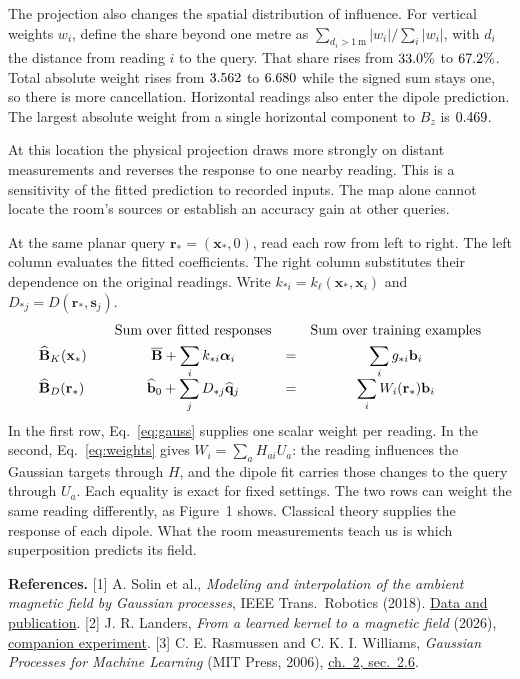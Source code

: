 \documentclass[11pt,letterpaper]{article}
\newcommand{\head}[1]{\par\Needspace{7\baselineskip}\medskip{\large\bfseries #1}\par\nobreak}
\newcommand{\B}{\mathbf B}
\newcommand{\bb}{\mathbf b}
\newcommand{\rr}{\mathbf r}
\newcommand{\xx}{\mathbf x}
\begin{document}
The projection also changes the spatial distribution of influence. For vertical
weights \(w_i\), define the share beyond one metre as
\(\sum_{d_i>1\,\mathrm m}|w_i|/\sum_i|w_i|\), with \(d_i\) the distance
from reading \(i\) to the query. That share rises from \(33.0\%\) to
\(67.2\%\). Total absolute weight rises from \(3.562\) to
\(6.680\) while the signed sum stays one, so there is more cancellation.
Horizontal readings also enter the dipole prediction. The largest absolute
weight from a single horizontal component to \(B_z\) is \(0.469\).

At this location the physical projection draws more strongly on distant
measurements and reverses the response to one nearby reading. This is a
sensitivity of the fitted prediction to recorded inputs. The map alone
cannot locate the room's sources or establish an accuracy gain at other queries.

\head{6. In what sense is the classical field learned?}
At the same planar query \(\rr_*=(\xx_*,0)\), read each row from left to right.
The left column evaluates the fitted coefficients. The right column substitutes
their dependence on the original readings. Write \(k_{*i}=k_\ell(\xx_*,\xx_i)\)
and \(D_{*j}=D(\rr_*,\mathbf s_j)\).
\[
\begin{array}{l@{\qquad}c@{\quad}c@{\quad}c}
 & \text{Sum over fitted responses} && \text{Sum over training examples}\\[4pt]
\widehat{\B}_K(\xx_*) &
 \displaystyle\overline{\B}+\sum_i k_{*i}\boldsymbol\alpha_i
 &=& \displaystyle\sum_i g_{*i}\bb_i \\[7pt]
\widehat{\B}_D(\rr_*) &
 \displaystyle\widehat{\bb}_0+\sum_j D_{*j}\widehat{\mathbf q}_j
 &=& \displaystyle\sum_i W_i(\rr_*)\bb_i
\end{array}
\]
In the first row, Eq.~\eqref{eq:gauss} supplies one scalar weight per reading.
In the second, Eq.~\eqref{eq:weights} gives \(W_i=\sum_a H_{ai}U_a\):
the reading influences the Gaussian targets through \(H\), and the dipole
fit carries those changes to the query through \(U_a\). Each equality is exact
for fixed settings. The two rows can weight the same reading differently,
as Figure~1 shows. Classical theory supplies the response of each dipole.
What the room measurements teach us is which superposition predicts its field.

{\footnotesize
\textbf{References.}
[1] A. Solin et al., \emph{Modeling and interpolation of the ambient magnetic
field by Gaussian processes}, IEEE Trans.\ Robotics (2018).
\href{https://github.com/AaltoML/magnetic-data}{Data and publication}.
[2] J. R. Landers, \emph{From a learned kernel to a magnetic field} (2026),
\href{../02-kernel-to-magnetostatics/kernel_to_magnetostatics.pdf}{companion experiment}.
[3] C. E. Rasmussen and C. K. I. Williams, \emph{Gaussian Processes for Machine
Learning} (MIT Press, 2006), \href{https://gaussianprocess.org/gpml/chapters/RW2.pdf}{ch.~2, sec.~2.6}.}
\end{document}
